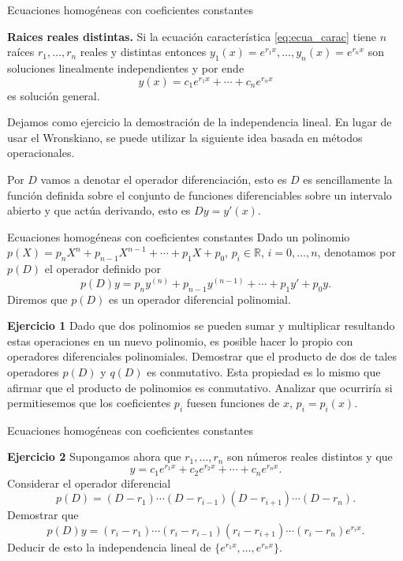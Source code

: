 \documentclass[handout,hyperref={colorlinks=true}]{beamer}
\newcommand{\rr}{\mathbb{R}}
\renewcommand{\emph}[1]{\textcolor[rgb]{1,0,0}{#1}}
\begin{document}
\begin{frame}{Ecuaciones homogéneas con coeficientes constantes}\label{pag:oper1}

\textbf{Raices reales distintas.}
Si la ecuación característica \eqref{eq:ecua_carac} tiene $n$ raíces $r_1,\ldots,r_n$ reales y distintas entonces 
$y_1(x)=e^{r_1x},\ldots,y_n(x)=e^{r_nx}$ son soluciones linealmente independientes y por ende
\[\boxed{y(x)=c_1e^{r_1x}+\cdots+c_ne^{r_nx}}\]
es solución general. 

Dejamos como ejercicio la demostración de la independencia lineal. En lugar de usar el Wronskiano, se puede utilizar  la siguiente idea basada en métodos operacionales. 

Por $D$ vamos a denotar el operador diferenciación, esto es $D$ es sencillamente la función  definida sobre el conjunto de funciones diferenciables sobre un intervalo abierto y que actúa derivando, esto es $Dy=y'(x)$. 





\end{frame}





\begin{frame}{Ecuaciones homogéneas con coeficientes constantes}\label{pag:oper2}
Dado un polinomio $p(X)=p_nX^n+p_{n-1}X^{n-1}+\cdots+p_1X+p_0$, $p_i\in\rr$, $i=0,\ldots,n$, denotamos por  $p(D)$ el operador definido por
\[p(D)y=p_ny^{(n)}+p_{n-1}y^{(n-1)}+\cdots+p_1y'+p_0y.\]
Diremos que $p(D)$ es un \emph{operador diferencial polinomial}. 

\textbf{Ejercicio 1} Dado que dos polinomios se pueden sumar y multiplicar resultando estas operaciones en un nuevo polinomio, es posible hacer lo propio con operadores diferenciales polinomiales. Demostrar que el producto de dos de tales operadores  $p(D)$ y $q(D)$ es conmutativo. Esta propiedad es lo mismo que afirmar que el producto de polinomios es conmutativo. Analizar que ocurriría si permitiesemos que los coeficientes $p_i$ fuesen funciones de $x$, $p_i=p_i(x)$.
 
\end{frame}

\begin{frame}{Ecuaciones homogéneas con coeficientes constantes}\label{pag:oper3}

\textbf{Ejercicio 2} Supongamos ahora que $r_1,\ldots,r_n$ son números reales distintos y que 
\[y=c_1e^{r_1x}+c_2e^{r_2x}+\cdots+c_ne^{r_nx}.\]
Considerar el operador diferencial
\[p(D)=(D-r_1)\cdots(D-r_{i-1})(D-r_{i+1})\cdots(D-r_n).\]
Demostrar que
\[p(D)y=(r_i-r_1)\cdots(r_i-r_{i-1})(r_i-r_{i+1})\cdots(r_i-r_n)e^{r_ix}.\]
Deducir de esto la independencia lineal de $\{e^{r_1x},\ldots,e^{r_nx}\}$.
\end{frame}
\end{document}
